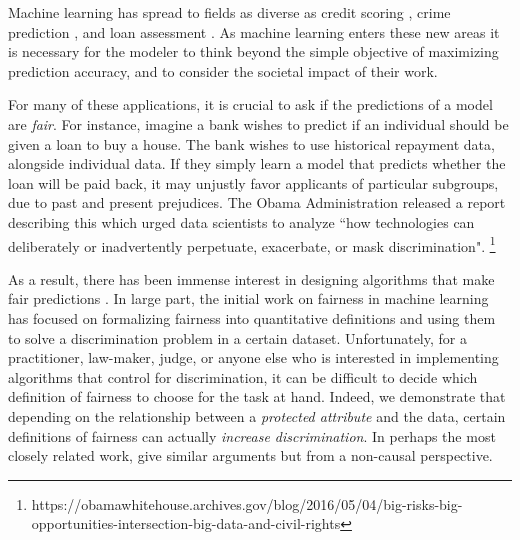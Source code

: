 Machine learning has spread to fields as diverse as credit scoring
\cite{khandani2010consumer}, crime prediction
\cite{brennan2009evaluating}, and loan assessment
\cite{mahoney2007method}. As machine learning enters these new areas
it is necessary for the modeler to think beyond the simple objective
of maximizing prediction accuracy, and to consider the societal impact
of their work. 

For many of these applications, it is crucial to ask if the
predictions of a model are \emph{fair}. For instance, imagine a bank
wishes to predict if an individual should be given a loan to buy a
house. The bank wishes to use historical repayment data, alongside
individual data. If they simply learn a model that predicts whether
the loan will be paid back, it may unjustly favor applicants of
particular subgroups, due to past and present prejudices. The Obama
Administration released a report describing this which urged data
scientists to analyze ``how technologies can deliberately or
inadvertently perpetuate, exacerbate, or mask
discrimination".
\footnote{https://obamawhitehouse.archives.gov/blog/2016/05/04/big-risks-big-opportunities-intersection-big-data-and-civil-rights}

As a result, there has been immense interest in designing
algorithms that make fair predictions
\cite{hardt2016equality,dwork2012fairness,joseph2016rawlsian,kamishima2011fairness,zliobaite2015survey,zafar2016fairness,zafar2015learning,grgiccase,kleinberg2016inherent,calders2010three,kamiran2012data,bolukbasi2016man,kamiran2009classifying,zemel2013learning,louizos2015variational}. 
In large part, the initial work on fairness in machine learning has
focused on formalizing fairness into quantitative definitions and using them to solve a
discrimination problem in a certain dataset. Unfortunately, for a
practitioner, law-maker, judge, or anyone else who is interested in
implementing algorithms that control for discrimination, it can be
difficult to decide which definition of fairness to choose for the
task at hand. Indeed, we demonstrate that depending on the
relationship between a {\it protected attribute} and the data, certain
definitions of fairness can actually \emph{increase discrimination}.
In perhaps the most closely related work, \citet{johnson2016impartial}
give similar arguments but from a non-causal perspective.

